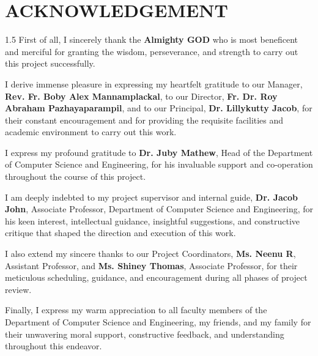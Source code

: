 \chapter*{ACKNOWLEDGEMENT}
\begin{spacing}{1.5}
First of all, I sincerely thank the \textbf{Almighty GOD} who is most beneficent and merciful for granting the wisdom, perseverance, and strength to carry out this project successfully.

I derive immense pleasure in expressing my heartfelt gratitude to our Manager, \textbf{Rev. Fr. Boby Alex Mannamplackal}, to our Director, \textbf{Fr. Dr. Roy Abraham Pazhayaparampil}, and to our Principal, \textbf{Dr. Lillykutty Jacob}, for their constant encouragement and for providing the requisite facilities and academic environment to carry out this work.

I express my profound gratitude to \textbf{Dr. Juby Mathew}, Head of the Department of Computer Science and Engineering, for his invaluable support and co-operation throughout the course of this project.

I am deeply indebted to my project supervisor and internal guide, \textbf{Dr. Jacob John}, Associate Professor, Department of Computer Science and Engineering, for his keen interest, intellectual guidance, insightful suggestions, and constructive critique that shaped the direction and execution of this work.

I also extend my sincere thanks to our Project Coordinators, \textbf{Ms. Neenu R}, Assistant Professor, and \textbf{Ms. Shiney Thomas}, Associate Professor, for their meticulous scheduling, guidance, and encouragement during all phases of project review.

Finally, I express my warm appreciation to all faculty members of the Department of Computer Science and Engineering, my friends, and my family for their unwavering moral support, constructive feedback, and understanding throughout this endeavor.
\end{spacing}
